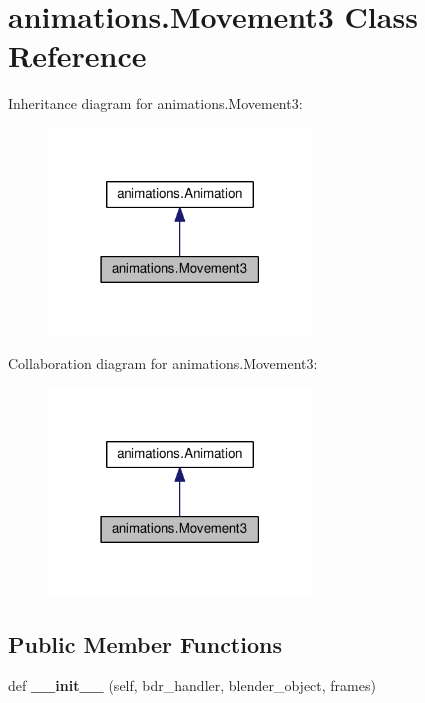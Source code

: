\hypertarget{classanimations_1_1Movement3}{}\section{animations.\+Movement3 Class Reference}
\label{classanimations_1_1Movement3}


Inheritance diagram for animations.\+Movement3\+:\nopagebreak
\begin{figure}[H]
\begin{center}
\leavevmode
\includegraphics[width=198pt]{classanimations_1_1Movement3__inherit__graph}
\end{center}
\end{figure}


Collaboration diagram for animations.\+Movement3\+:\nopagebreak
\begin{figure}[H]
\begin{center}
\leavevmode
\includegraphics[width=198pt]{classanimations_1_1Movement3__coll__graph}
\end{center}
\end{figure}
\subsection*{Public Member Functions}
\begin{DoxyCompactItemize}
\item 
def {\bfseries \+\_\+\+\_\+init\+\_\+\+\_\+} (self, bdr\+\_\+handler, blender\+\_\+object, frames)\hypertarget{classanimations_1_1Movement3_a80d694eca808563a7b645a7230d8819a}{}\label{classanimations_1_1Movement3_a80d694eca808563a7b645a7230d8819a}

\end{DoxyCompactItemize}
